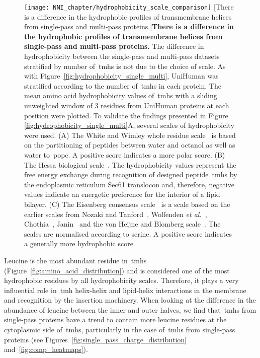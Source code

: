 \begin{figure}[!ht]
\centering
\texttt{[image: NNI\_chapter/hydrophobicity\_scale\_comparison]}
[There is a difference in the hydrophobic profiles of transmembrane helices from single-pass and multi-pass proteins.]{\textbf{There is a difference in the hydrophobic profiles of transmembrane helices from single-pass and multi-pass proteins.}
The difference in hydrophobicity between the single-pass and multi-pass datasets stratified by number of~\gls{tmh}s is not due to the choice of scale.
As with Figure~\ref{fig:hydrophobicity_single_multi}, UniHuman was stratified according to the number of~\gls{tmh}s in each protein.
The mean amino acid hydrophobicity values of~\gls{tmh}s with a sliding unweighted window of 3 residues from UniHuman proteins at each position were plotted.
To validate the findings presented in Figure \ref{fig:hydrophobicity_single_multi}A, several scales of hydrophobicity were used.
(A) The White and Wimley whole residue scale~\cite{White1999} is based on the partitioning of peptides between water and octanol as well as water to~\gls{popc}.
A positive score indicates a more polar score.
(B) The Hessa biological scale~\cite{Hessa2005}.
The hydrophobicity values represent the free energy exchange during recognition of designed peptide~\gls{tmh}s by the endoplasmic reticulum Sec61 translocon and, therefore, negative values indicate an energetic preference for the interior of a lipid bilayer.
(C) The Eisenberg consensus scale~\cite{Eisenberg1984} is a scale based on the earlier scales from Nozaki and Tanford~\cite{Nozaki1971}, Wolfenden \textit{et al.}~\cite{Wolfenden1981}, Chothia~\cite{Chothia1976}, Janin~\cite{Janin1979} and the von Heijne and Blomberg scale~\cite{VonHeijne1979}.
The scales are normalised according to serine.
A positive score indicates a generally more hydrophobic score.}

\label{fig:hydrophobicity_scale_comparison}
\end{figure}

Leucine is the most abundant residue in~\gls{tmh}s (Figure~\ref{fig:amino_acid_distribution}) and is considered one of the most hydrophobic residues by all hydrophobicity scales.
Therefore, it plays a very influential role in~\gls{tmh} helix-helix and lipid-helix interactions in the membrane and recognition by the insertion machinery.
When looking at the difference in the abundance of leucine between the inner and outer halves, we find that~\gls{tmh}s from single-pass proteins have a trend to contain more leucine residues at the cytoplasmic side of~\gls{tmh}s, particularly in the case of~\gls{tmh}s from single-pass proteins (see Figures~\ref{fig:single_pass_charge_distribution} and~\ref{fig:comp_heatmaps}).

